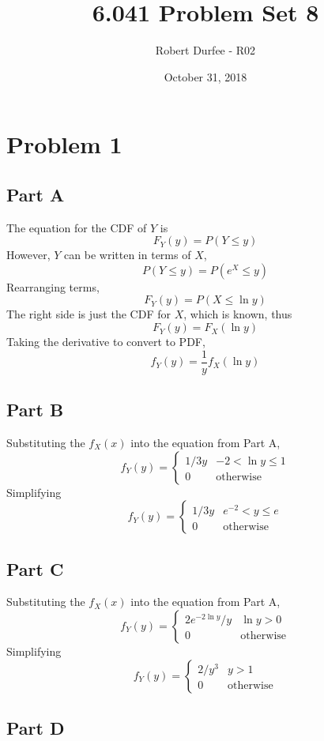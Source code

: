 \documentclass{article}
\title{6.041 Problem Set 8}
\author{Robert Durfee - R02}
\date{October 31, 2018}
\begin{document}
\maketitle

\section*{Problem 1}

\subsection*{Part A}

The equation for the CDF of $Y$ is
$$ F_Y(y) = P(Y \leq y) $$
However, $Y$ can be written in terms of $X$, 
$$ P(Y \leq y) = P(e^X \leq y) $$
Rearranging terms,
$$ F_Y(y) = P(X \leq \ln y) $$
The right side is just the CDF for $X$, which is known, thus
$$ F_Y(y) = F_X(\ln y) $$
Taking the derivative to convert to PDF,
$$ f_Y(y) = \frac{1}{y} f_X(\ln y) $$

\subsection*{Part B}

Substituting the $f_X(x)$ into the equation from Part A,
$$ f_Y(y) = \begin{cases}
  1 / 3y & -2 < \ln y \leq 1 \\
  0 & \mathrm{otherwise}
\end{cases} $$
Simplifying
$$ f_Y(y) = \begin{cases}
  1 / 3y & e^{-2} < y \leq e \\
  0 & \mathrm{otherwise}
\end{cases} $$

\subsection*{Part C}

Substituting the $f_X(x)$ into the equation from Part A,
$$ f_Y(y) = \begin{cases}
  2 e^{-2 \ln y} / y & \ln y > 0 \\
  0 & \mathrm{otherwise}
\end{cases} $$
Simplifying
$$ f_Y(y) = \begin{cases}
  2 / y^3 & y > 1 \\
  0 & \mathrm{otherwise}
\end{cases} $$

\subsection*{Part D}
\end{document}
